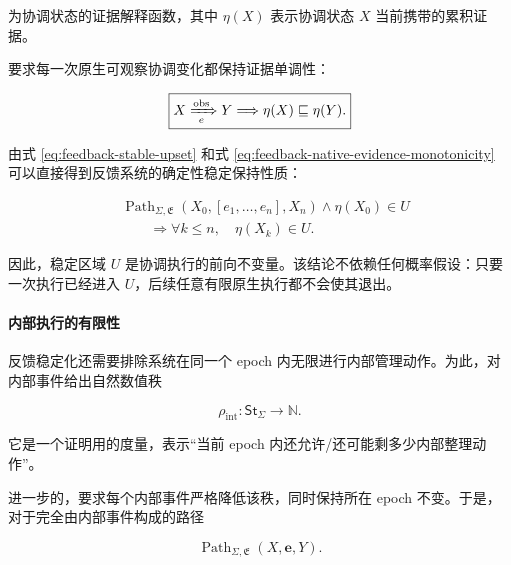   为协调状态的证据解释函数，其中 $\eta(X)$ 表示协调状态 $X$ 当前携带的累积证据。

  要求每一次原生可观察协调变化都保持证据单调性：

  \begin{equation}
    \boxed{
      X\xRightarrow[e]{\mathrm{obs}}Y
      \Longrightarrow
      \eta(X)\sqsubseteq\eta(Y).
    }
    \label{eq:feedback-native-evidence-monotonicity}
  \end{equation}

  由式 \eqref{eq:feedback-stable-upset} 和式
  \eqref{eq:feedback-native-evidence-monotonicity} 可以直接得到反馈系统的确定性稳定保持性质：

  \begin{equation}
    \boxed{
      \begin{aligned}
        &
        \operatorname{Path}_{\Sigma,\mathfrak E}
        (X_0,[e_1,\ldots,e_n],X_n)
        \land
        \eta(X_0)\in U
        \\
        &\qquad\Longrightarrow
        \forall k\le n,\quad
        \eta(X_k)\in U.
      \end{aligned}
    }
    \label{eq:feedback-hard-forward-invariance}
  \end{equation}

  因此，稳定区域 $U$ 是协调执行的前向不变量。该结论不依赖任何概率假设：只要一次执行已经进入 $U$，后续任意有限原生执行都不会使其退出。

  \paragraph{内部执行的有限性}

  反馈稳定化还需要排除系统在同一个 epoch 内无限进行内部管理动作。为此，对内部事件给出自然数值秩

  \begin{equation}
    \boxed{
    \rho_{\mathrm{int}}:
    \mathsf{St}_{\Sigma}
    \longrightarrow
    \mathbb N.}
    \label{eq:feedback-internal-rank-function}
  \end{equation}

  它是一个证明用的度量，表示“当前 epoch 内还允许/还可能剩多少内部整理动作”。

  进一步的，要求每个内部事件严格降低该秩，同时保持所在 epoch 不变。于是，对于完全由内部事件构成的路径

  \begin{equation}
    \boxed{
    \operatorname{Path}_{\Sigma,\mathfrak E}
    (X,\mathbf e,Y).}
    \label{eq:feedback-internal-only-path}
  \end{equation}

